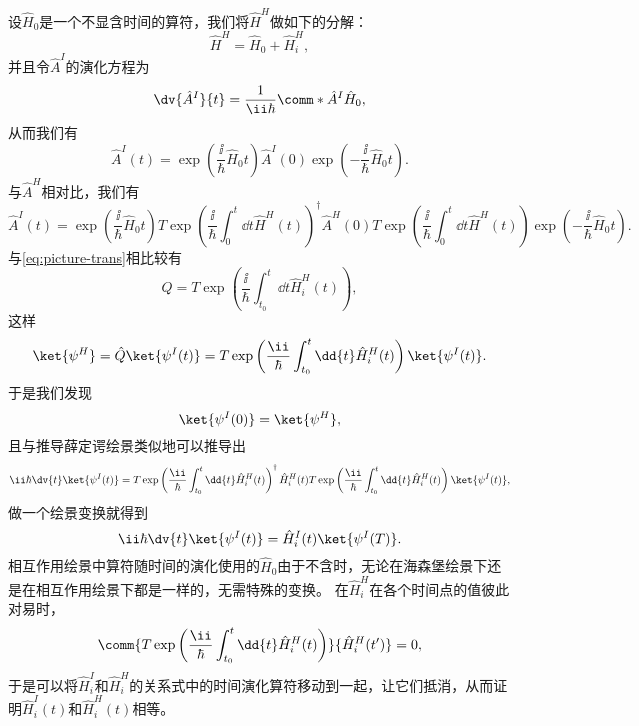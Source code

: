 设$\hat{H}_0$是一个不显含时间的算符，我们将$\hat{H}^H$做如下的分解：
\begin{equation}
    \hat{H}^H = \hat{H}_0 + \hat{H}^H_i,
\end{equation}
并且令$\hat{A}^I$的演化方程为
\begin{equation}
    \dv{\hat{A}^I}{t} = \frac{1}{\ii \hbar} \comm*{\hat{A}^I}{\hat{H}_0},
\end{equation}
从而我们有
\begin{equation}
    \hat{A}^I (t) = \exp \left( \frac{\ii}{\hbar} \hat{H}_0 t \right) \hat{A}^I (0) \exp \left( - \frac{\ii}{\hbar} \hat{H}_0 t \right).
\end{equation}
与$\hat{A}^H$相对比，我们有
\[
    \hat{A}^I (t) = \exp\left(\frac{\ii}{\hbar}\hat{H}_0 t\right) T \exp \left( \frac{\ii}{\hbar} \int_0^t \dd{t} \hat{H}^H(t) \right)^\dagger \hat{A}^H(0) T \exp \left( \frac{\ii}{\hbar} \int_0^t \dd{t} \hat{H}^H(t) \right) \exp\left(-\frac{\ii}{\hbar}\hat{H}_0 t\right).
\]
与\eqref{eq:picture-trans}相比较有
\[
    \hat{Q} = T \exp \left( \frac{\ii}{\hbar} \int_{t_0}^t \dd{t} \hat{H}^H_i (t) \right),
\]
这样
\[
    \ket{\psi^H} = \hat{Q} \ket{\psi^I (t)} = T \exp \left( \frac{\ii}{\hbar} \int_{t_0}^t \dd{t} \hat{H}^H_i (t) \right) \ket{\psi^I (t)}.
\]
于是我们发现
\[
    \ket{\psi^I (0)} = \ket{\psi^H},
\]
且与推导薛定谔绘景类似地可以推导出
\[
    \ii \hbar \dv{t} \ket{\psi^I (t)} = T \exp \left( \frac{\ii}{\hbar} \int_{t_0}^t \dd{t} \hat{H}^H_i (t) \right)^\dagger \hat{H}_i^H (t) T \exp \left( \frac{\ii}{\hbar} \int_{t_0}^t \dd{t} \hat{H}^H_i (t) \right) \ket{\psi^I(t)},
\]
做一个绘景变换就得到
\begin{equation}
    \ii \hbar \dv{t} \ket{\psi^I (t)} = \hat{H}^I_i (t) \ket{\psi^I (T)}.
    
\end{equation}
相互作用绘景中算符随时间的演化使用的$\hat{H}_0$由于不含时，无论在海森堡绘景下还是在相互作用绘景下都是一样的，无需特殊的变换。
在$\hat{H}_i^H$在各个时间点的值彼此对易时，
\[
    \comm{T \exp \left( \frac{\ii}{\hbar} \int_{t_0}^t \dd{t} \hat{H}^H_i (t) \right)}{\hat{H}_i^H(t')} = 0,
\]
于是可以将$\hat{H}^I_i$和$\hat{H}^H_i$的关系式中的时间演化算符移动到一起，让它们抵消，从而证明$\hat{H}^I_i(t)$和$\hat{H}^H_i(t)$相等。